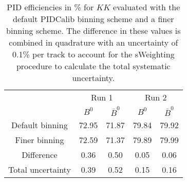 \begin{table}
    \centering
    \begin{tabular}{ccccc}
    \toprule
& \multicolumn{2}{c}{Run 1} & \multicolumn{2}{c}{Run 2}\\
& $B^0$ & $\bar{B}^0$ & $B^0$ & $\bar{B}^0$\\
    \midrule
Default binning & 72.95 & 71.87 & 79.84 & 79.92\\
Finer binning & 72.59 & 71.37 & 79.89 & 79.99\\
Difference & 0.36 & 0.50 & 0.05 & 0.06\\
Total uncertainty & 0.39 & 0.52 & 0.15 & 0.16\\
    \bottomrule
    \end{tabular}
    \caption{PID efficiencies in \% for $KK$ evaluated with the default PIDCalib binning scheme and a finer binning scheme. The difference in these values is combined in quadrature with an uncertainty of 0.1\% per track to account for the sWeighting procedure to calculate the total systematic uncertainty.}
\label{tab:final_PID_KK}
\end{table}
